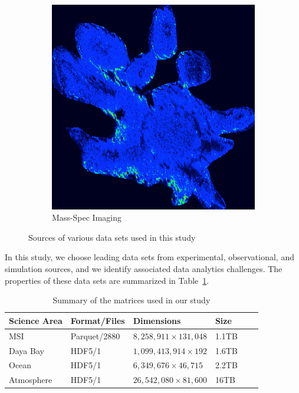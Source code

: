 \begin{figure}
\begin{subfigure}[b]{0.22\textwidth}
\includegraphics[width=\textwidth]{fig/mass-spec.png}
\caption{Mass-Spec Imaging}
\label{fig:mass-spec}
\end{subfigure}
\caption{Sources of various data sets used in this study}\label{fig:datasets}
\end{figure}
In this study, we choose leading data sets from experimental, observational, and simulation sources, and we identify associated data analytics challenges. 
The properties of these data sets are summarized in Table~\ref{table:datasets}.

\begin{table}[ht]
\centering
\caption{Summary of the matrices used in our study}
\label{table:datasets}
\begin{tabular}{p{2cm}lllll@{}}
\toprule
Science Area & Format/Files & Dimensions & Size  \\ \midrule
MSI      & Parquet/2880        &  $8,258,911 \times 131,048$          & 1.1TB  \\
Daya Bay & HDF5/1      &   $1,099,413,914 \times 192$         & 1.6TB \\
Ocean              & HDF5/1      &  $6,349,676 \times 46,715$          & 2.2TB \\
Atmosphere           & HDF5/1       & $26,542,080 \times 81,600$           & 16TB \\ \bottomrule
\end{tabular}
\end{table}



